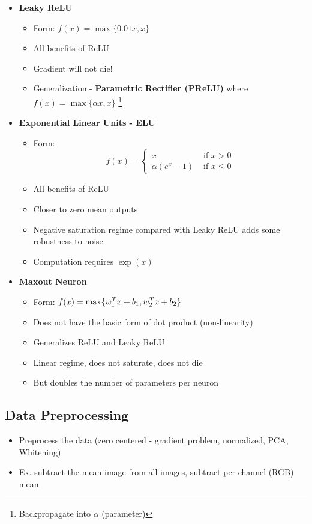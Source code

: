 \begin{itemize}
\begin{itemize}
	\end{itemize}
	\item \textbf{Leaky ReLU}
	\begin{itemize}
		\item Form: $f(x) = \max\{0.01x, x\}$
		\item All benefits of ReLU
		\item Gradient will not die!
		\item Generalization - \textbf{Parametric Rectifier (PReLU)} where $f(x) = \max\{\alpha x, x\}$ \footnote{Backpropagate into $\alpha$ (parameter)}
	\end{itemize}
	\item \textbf{Exponential Linear Units - ELU}
	\begin{itemize}
		\item Form:
		$$f(x) = \begin{cases}
			x & \text{ if } x > 0\\ \alpha (e^x - 1) & \text{ if } x \leq 0
		\end{cases}$$
		\item All benefits of ReLU
		\item Closer to zero mean outputs
		\item Negative saturation regime compared with Leaky ReLU adds some robustness to noise
		\item Computation requires $\exp(x)$
	\end{itemize}
	\item \textbf{Maxout Neuron}
	\begin{itemize}
		\item Form: $f(x) = \max\{w_1^T x + b_1, w_2^T x + b_2\}$
		\item Does not have the basic form of dot product (non-linearity)
		\item Generalizes ReLU and Leaky ReLU
		\item Linear regime, does not saturate, does not die
		\item But doubles the number of parameters per neuron
	\end{itemize}
\end{itemize}

\subsection{Data Preprocessing}
\begin{itemize}
	\item Preprocess the data (zero centered - gradient problem, normalized, PCA, Whitening) 
	\item Ex. subtract the mean image from all images, subtract per-channel (RGB) mean
\end{itemize}


